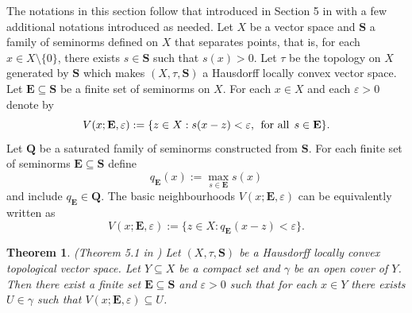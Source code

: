\documentclass{article}
\def\text#1{\,\;\hbox{#1}\;\,}
\newtheorem{theo}{Theorem}[section]
\begin{document}
The notations in this section follow that introduced in Section 5 in \cite{MR} with a few additional notations introduced as needed. Let $X$ be a vector space and $\mathbf{S}$ a family of seminorms defined on $X$ that separates points, that is, for each $x \in X \setminus \{0\}$, there exists $s \in \mathbf{S}$ such that $s(x) > 0$.  Let $\tau$ be the topology on $X$ generated by $\mathbf{S}$ which makes $(X, \tau, \mathbf{S})$ a Hausdorff locally convex vector space. Let $\mathbf{E} \subseteq \mathbf{S}$ be a finite set of seminorms on $X$. For each $x \in X$ and each $\varepsilon>0$ denote by
\[V(x;\mathbf{E},\varepsilon):=\{z \in X: s(x-z)<\varepsilon, \text{for all} s \in \mathbf{E}\}.\]
Let $\mathbf{Q}$ be a saturated family of seminorms constructed from $\mathbf{S}$. For each finite set of seminorms $\mathbf{E} \subseteq \mathbf{S}$ define 
\[q_{\mathbf{E}}(x):=\max_{s \in \mathbf{E}} s(x)\] 
and include $q_{\mathbf{E}} \in \mathbf{Q}$. The basic neighbourhoods $V(x;\mathbf{E},\varepsilon)$ can be equivalently written as 
\[V(x;\mathbf{E},\varepsilon):=\{z \in X: q_{\mathbf{E}}(x-z)<\varepsilon\}.\]
\begin{theo} \label{cover} (Theorem 5.1 in \cite{MR})
Let $(X, \tau, \mathbf{S})$ be a Hausdorff locally convex topological vector space. Let $Y  \subseteq X$ be a compact 
set and $\gamma$ be an open cover of $Y$. Then there exist a finite set $\mathbf{E} \subseteq \mathbf{S}$ and
$\varepsilon>0$ such that for each $x \in Y$ there exists $U \in \gamma$ such that $V (x; \mathbf{E},\varepsilon) \subseteq U$.
\end{theo}
\end{document}
